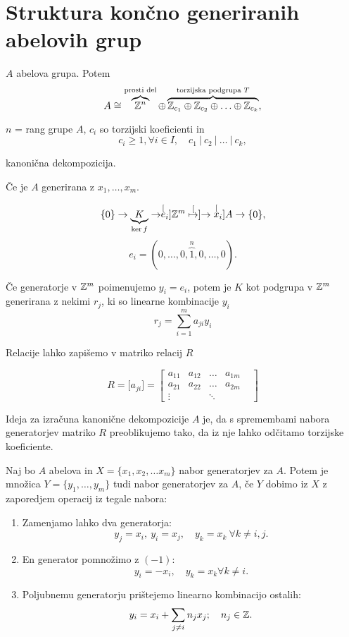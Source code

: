 \section{Struktura kon\v cno generiranih abelovih grup}

$A$ abelova grupa. Potem
\[
	A \cong \overbrace{\mathbb{Z}^n}^\text{prosti del} \oplus \overbrace{\mathbb{Z}_{c_1} \oplus \mathbb{Z}_{c_2} \oplus \ldots \oplus \mathbb{Z}_{c_k}}^\text{torzijska podgrupa $T$},
\]

\ni $n$ = rang grupe $A$, $c_i$ so torzijski koeficienti in
\[
	c_i \geq 1, \forall i \in I, \quad c_1\ |\ c_2\ |\ \ldots\ |\ c_k,
\]

kanoni\v cna dekompozicija.

\v Ce je $A$ generirana z $x_1, \ldots, x_m$.

\[
	\{0\} \to \underbrace{K}_{\ker f} \to \stackrel[e_i]{}{ \ensuremath{\mathbb{Z}} ^m} \stackrel[\mapsto]{}{\to} \stackrel[x_i]{}{A} \to \{ 0\},
\]
\[
	e_i = (0,\ldots,0,\overbrace{1}^{n},0,\ldots,0).
\]

\ni \v Ce generatorje v $\mathbb{Z}^m$ poimenujemo $y_i = e_i$, potem je $K$ kot podgrupa v $\mathbb{Z}^m$ generirana z nekimi $r_j$, ki so linearne kombinacije $y_i$
\[
	r_j = \sum_{i = 1}^m a_{ji} y_i
\]

\ni Relacije lahko zapi\v semo v matriko relacij $R$

\[
	R = \big[a_{ji}\big] =
	\begin{bmatrix}
		a_{11} & a_{12} & \ldots & a_{1m} \\
		a_{21} & a_{22} & \ldots & a_{2m} \\
		\vdots &  & \ddots & & 
	\end{bmatrix}
\]

\ni Ideja za izra\v cuna kanoni\v cne dekompozicije $A$ je, da s spremembami nabora generatorjev matriko $R$ preoblikujemo tako,
da iz nje lahko od\v citamo torzijske koeficiente.

\begin{trditev}
	Naj bo $A$ abelova in $X = \{x_1, x_2, \ldots x_m\}$ nabor generatorjev za $A$. Potem je mno\v zica $Y = \{y_1, \ldots, y_m\}$
	tudi nabor generatorjev za $A$, \v ce $Y$ dobimo iz $X$ z zaporedjem operacij iz tegale nabora:
	\begin{enumerate}
		\item{Zamenjamo lahko dva generatorja:
			\[
				y_j = x_i,\ y_i = x_j, \quad y_k = x_k\ \forall k \neq i,j.
			\]}
		\item{En generator pomno\v zimo z $(-1)$:
			\[
				y_i = -x_i, \quad y_k = x_k \forall k \neq i.
			\]}
		\item{Poljubnemu generatorju pri\v stejemo linearno kombinacijo ostalih:
			\[
				y_i = x_i + \sum_{j \neq i} n_j x_j; \quad n_j \in \mathbb{Z}.
			\]}
	\end{enumerate}
\end{trditev}


